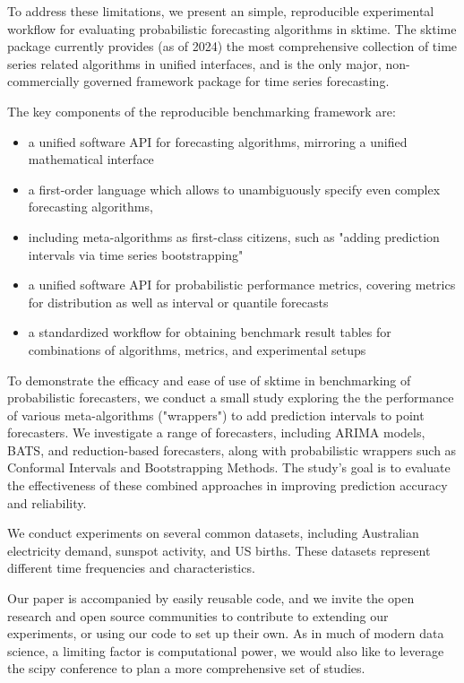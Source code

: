 \documentclass{article}
\begin{document}
To address these limitations, we present an simple, reproducible experimental workflow for evaluating probabilistic forecasting algorithms in sktime.
The sktime package currently provides (as of 2024) the most comprehensive collection of time series related algorithms in unified interfaces, and is the only major, non-commercially governed framework package for time series forecasting.

The key components of the reproducible benchmarking framework are:

\begin{itemize}
  \item a unified software API for forecasting algorithms, mirroring a unified mathematical interface
  \item a first-order language which allows to unambiguously specify even complex forecasting algorithms,
  \item including meta-algorithms as first-class citizens, such as "adding prediction intervals via time series bootstrapping"
  \item a unified software API for probabilistic performance metrics, covering metrics for distribution as well as interval or quantile forecasts
  \item a standardized workflow for obtaining benchmark result tables for combinations of algorithms, metrics, and experimental setups
\end{itemize}

To demonstrate the efficacy and ease of use of sktime in benchmarking of probabilistic forecasters, we conduct a small study exploring the the performance of various meta-algorithms ("wrappers") to add prediction intervals to point forecasters. We investigate a range of forecasters, including ARIMA models, BATS, and reduction-based forecasters, along with probabilistic wrappers such as Conformal Intervals and Bootstrapping Methods. The study's goal is to evaluate the effectiveness of these combined approaches in improving prediction accuracy and reliability.

We conduct experiments on several common datasets, including Australian electricity demand, sunspot activity, and US births. These datasets represent different time frequencies and characteristics.

Our paper is accompanied by easily reusable code, and we invite the open research and open source communities to contribute to extending our experiments, or using our code to set up their own. As in much of modern data science, a limiting factor is computational power, we would also like to leverage the scipy conference to plan a more comprehensive set of studies.
\end{document}
